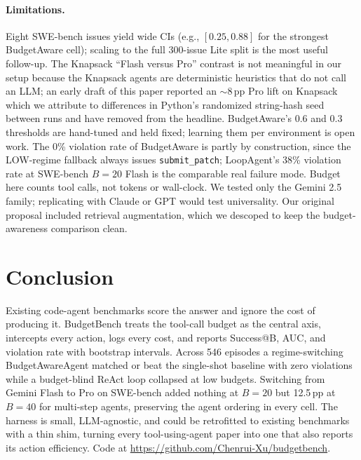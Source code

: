 \documentclass[journal=jacsat,manuscript=article]{achemso}
\begin{document}
\paragraph{Limitations.}
Eight SWE-bench issues yield wide CIs (e.g., $[0.25, 0.88]$ for the
strongest BudgetAware cell); scaling to the full 300-issue Lite split
is the most useful follow-up. The Knapsack ``Flash versus Pro''
contrast is not meaningful in our setup because the Knapsack agents
are deterministic heuristics that do not call an LLM; an early draft
of this paper reported an $\sim$8\,pp Pro lift on Knapsack which we
attribute to differences in Python's randomized string-hash seed
between runs and have removed from the headline. BudgetAware's 0.6
and 0.3 thresholds are hand-tuned and held fixed; learning them per
environment is open work. The 0\% violation rate of BudgetAware is
partly by construction, since the LOW-regime fallback always issues
\texttt{submit\_patch}; LoopAgent's 38\% violation rate at SWE-bench
$B{=}20$ Flash is the comparable real failure mode. Budget here
counts tool calls, not tokens or wall-clock. We tested only the
Gemini 2.5 family; replicating with Claude or GPT would test
universality. Our original proposal included retrieval augmentation,
which we descoped to keep the budget-awareness comparison clean.

\section{Conclusion}

Existing code-agent benchmarks score the answer and ignore the cost
of producing it. BudgetBench treats the tool-call budget as the
central axis, intercepts every action, logs every cost, and reports
Success@B, AUC, and violation rate with bootstrap intervals. Across
546 episodes a regime-switching BudgetAwareAgent matched or beat the
single-shot baseline with zero violations while a budget-blind
ReAct loop collapsed at low budgets. Switching from Gemini Flash to
Pro on SWE-bench added nothing at $B = 20$ but 12.5\,pp at $B = 40$
for multi-step agents, preserving the agent ordering in every cell. The harness is small, LLM-agnostic, and
could be retrofitted to existing benchmarks with a thin shim,
turning every tool-using-agent paper into one that also reports its
action efficiency. Code at
\url{https://github.com/Chenrui-Xu/budgetbench}.

\clearpage


\end{document}
